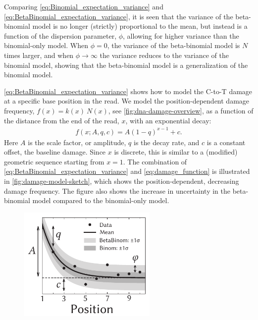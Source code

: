 Comparing \autoref{eq:Binomial_expectation_variance} and \autoref{eq:BetaBinomial_expectation_variance}, it is seen that the variance of the beta-binomial model is no longer (strictly) proportional to the mean, but instead is a function of the dispersion parameter, $\phi$, allowing for higher variance than the binomial-only model. When $\phi = 0$, the variance of the beta-binomial model is $N$ times larger, and when $\phi \rightarrow \infty$ the variance reduces to the variance of the binomial model, showing that the beta-binomial model is a generalization of the binomial model.

\autoref{eq:BetaBinomial_expectation_variance} shows how to model the C-to-T damage at a specific base position in the read. We model the position-dependent damage frequency, $f(x) = k(x) \ N(x)$, see \autoref{fig:dna-damage-overview}, as a function of the distance from the end of the read, $x$, with an exponential decay:
\begin{align}
    f(x; A, q, c) = A(1-q)^{x-1} + c.
    \label{eq:damage_function}
\end{align}
Here $A$ is the scale factor, or amplitude, $q$ is the decay rate, and $c$ is a constant offset, the baseline damage. Since $x$ is discrete, this is similar to a (modified) geometric sequence starting from $x=1$. The combination of \autoref{eq:BetaBinomial_expectation_variance} and \autoref{eq:damage_function} is illustrated in \autoref{fig:damage-model-sketch}, which shows the position-dependent, decreasing damage frequency. The figure also shows the increase in uncertainty in the beta-binomial model compared to the binomial-only model.
\begin{figure}[htbp]
    \centering
    \includegraphics[width=0.6\textwidth]{figures/damage_sketch_new.pdf}
\end{figure}

